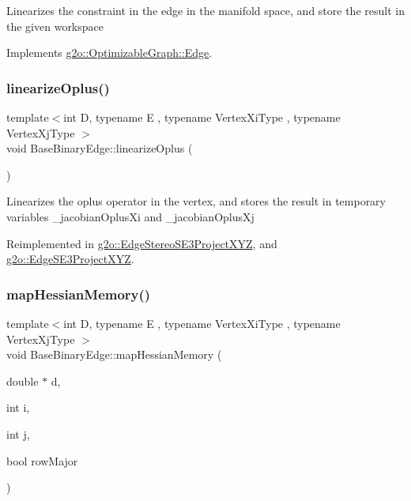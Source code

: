 Linearizes the constraint in the edge in the manifold space, and store the result in the given workspace 

Implements \mbox{\hyperlink{classg2o_1_1_optimizable_graph_1_1_edge_a0fdad5ebfb4efec9f893b57f67e0fbe1}{g2o\+::\+Optimizable\+Graph\+::\+Edge}}.

\mbox{\label{classg2o_1_1_base_binary_edge_af0fb8a693c8c7996fa65566e7263fbc4}} 
\subsubsection{\texorpdfstring{linearize\+Oplus()}{linearizeOplus()}\hspace{0.1cm}{\footnotesize\ttfamily [2/2]}}
{\footnotesize\ttfamily template$<$int D, typename E , typename Vertex\+Xi\+Type , typename Vertex\+Xj\+Type $>$ \\
void Base\+Binary\+Edge\+::linearize\+Oplus (\begin{DoxyParamCaption}{ }\end{DoxyParamCaption})\hspace{0.3cm}{\ttfamily [virtual]}}

Linearizes the oplus operator in the vertex, and stores the result in temporary variables \+\_\+jacobian\+Oplus\+Xi and \+\_\+jacobian\+Oplus\+Xj 

Reimplemented in \mbox{\hyperlink{classg2o_1_1_edge_stereo_s_e3_project_x_y_z_aea04d86a304c6cb4e2a3f34b35166f30}{g2o\+::\+Edge\+Stereo\+S\+E3\+Project\+X\+YZ}}, and \mbox{\hyperlink{classg2o_1_1_edge_s_e3_project_x_y_z_a7454e89740635d782c9e4efaef35ec44}{g2o\+::\+Edge\+S\+E3\+Project\+X\+YZ}}.

\mbox{\label{classg2o_1_1_base_binary_edge_ada358930854d386a4e8c32f64078e052}} 
\subsubsection{\texorpdfstring{map\+Hessian\+Memory()}{mapHessianMemory()}}
{\footnotesize\ttfamily template$<$int D, typename E , typename Vertex\+Xi\+Type , typename Vertex\+Xj\+Type $>$ \\
void Base\+Binary\+Edge\+::map\+Hessian\+Memory (\begin{DoxyParamCaption}\item[{double $\ast$}]{d,  }\item[{int}]{i,  }\item[{int}]{j,  }\item[{bool}]{row\+Major }\end{DoxyParamCaption})\hspace{0.3cm}{\ttfamily [virtual]}}

